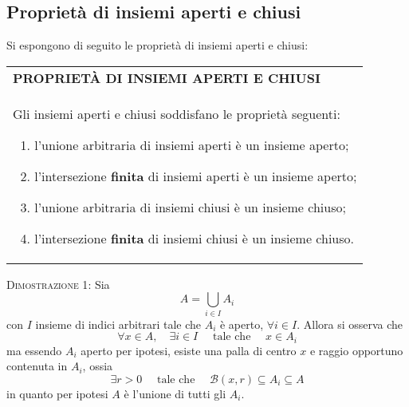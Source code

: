 \documentclass[a4paper]{extarticle}
\renewcommand\arraystretch{}
\begin{document}
\vspace{1em}
\noindent
\subsection{Proprietà di insiemi aperti e chiusi}
Si espongono di seguito le proprietà di insiemi aperti e chiusi:

\vspace{1em}
\setlength{\tabcolsep}{14pt}
\renewcommand{\arraystretch}{2}
\noindent
\begin{tabularx}{\textwidth}{@{}|P|@{}}
    \hline
    {\textbf{PROPRIETÀ DI INSIEMI APERTI E CHIUSI}}\\
    \parbox{\linewidth}{Gli insiemi aperti e chiusi soddisfano le proprietà seguenti:
    \begin{enumerate}
        \item l'unione arbitraria di insiemi aperti è un insieme aperto;
        \item l'intersezione \textbf{finita} di insiemi aperti è un insieme aperto;
        \item l'unione arbitraria di insiemi chiusi è un insieme chiuso;
        \item l'intersezione \textbf{finita} di insiemi chiusi è un insieme chiuso.
    \end{enumerate}
    \vspace{1mm}}\\
    \hline
\end{tabularx}

\vspace{2em}
\noindent
\normalfont \normalsize
\textsc{Dimostrazione 1}: Sia
\[A=\bigcup_{i \in I} A_i\]
con $I$ insieme di indici arbitrari tale che $A_i$ è aperto, $\forall i \in I$. Allora si osserva che
\[\forall x \in A, \hspace{1em} \exists i \in I \hspace{1em} \text{ tale che } \hspace{1em} x \in A_i\]
ma essendo $A_i$ aperto per ipotesi, esiste una palla di centro $x$ e raggio opportuno contenuta in $A_i$, ossia
\[\exists r > 0  \hspace{1em} \text{ tale che } \hspace{1em} \mathcal{B}(x,r) \subseteq A_i \subseteq A\]
in quanto per ipotesi $A$ è l'unione di tutti gli $A_i$.
\end{document}
